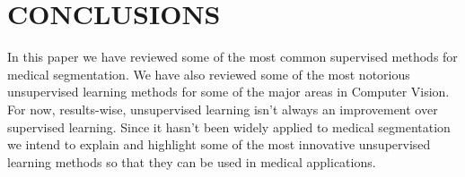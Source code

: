 \documentclass[letterpaper, 10 pt, conference]{ieeeconf}  %
\begin{document}


\section{CONCLUSIONS}
In this paper we have reviewed some of the most common supervised methods for medical segmentation. We have also reviewed some of the most notorious unsupervised learning methods for some of the major areas in Computer Vision. For now, results-wise, unsupervised learning isn't always an improvement over supervised learning. Since it hasn't been widely applied to medical segmentation we intend to explain and highlight some of the most innovative unsupervised learning methods so that they can be used in medical applications. 



\end{document}
